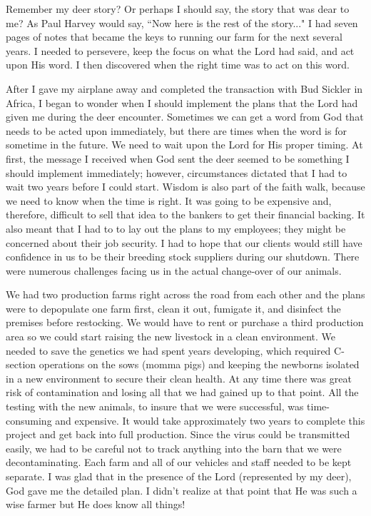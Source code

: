 \documentclass[oneside]{book}
\begin{document}
Remember my deer story? Or perhaps I should say, the story that was dear to me? As Paul Harvey would say, ``Now here is the rest of the story..." I had seven pages of notes that became the keys to running our farm for the next several years. I needed to persevere, keep the focus on what the Lord had said, and act upon His word. I then discovered when the right time was to act on this word.

After I gave my airplane away and completed the transaction with Bud Sickler in Africa, I began to wonder when I should implement the plans that the Lord had given me during the deer encounter. Sometimes we can get a word from God that needs to be acted upon immediately, but there are times when the word is for sometime in the future. We need to wait upon the Lord for His proper timing. At first, the message I received when God sent the deer seemed to be something I should implement immediately; however, circumstances dictated that I had to wait two years before I could start. Wisdom is also part of the faith walk, because we need to know when the time is right. It was going to be expensive and, therefore, difficult to sell that idea to the bankers to get their financial backing. It also meant that I had to to lay out the plans to my employees; they might be concerned about their job security. I had to hope that our clients would still have confidence in us to be their breeding stock suppliers during our shutdown. There were numerous challenges facing us in the actual change-over of our animals. 
 
We had two production farms right across the road from each other and the plans were to depopulate one farm first, clean it out, fumigate it, and disinfect the premises before restocking. We would have to rent or purchase a third production area so we could start raising the new livestock in a clean environment. We needed to save the genetics we had spent years developing, which required C-section operations on the sows (momma pigs) and keeping the newborns isolated in a new environment to secure their clean health. At any time there was great risk of contamination and losing all that we had gained up to that point. All the testing with the new animals, to insure that we were successful, was time-consuming and expensive. It would take approximately two years to complete this project and get back into full production. Since the virus could be transmitted easily, we had to be careful not to track anything into the barn that we were decontaminating. Each farm and all of our vehicles and staff needed to be kept separate. I was glad that in the presence of the Lord (represented by my deer), God gave me the detailed plan. I didn't realize at that point that He was such a wise farmer but He does know all things!
\end{document}
